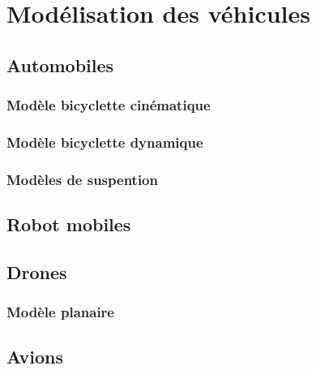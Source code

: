 \chapter{Modélisation des véhicules}



\section{Automobiles}
\subsection{Modèle bicyclette cinématique}
\subsection{Modèle bicyclette dynamique}
\subsection{Modèles de suspention}
\section{Robot mobiles}
\section{Drones}
\subsection{Modèle planaire}
\section{Avions}